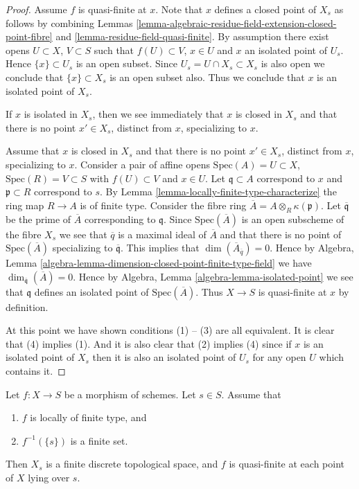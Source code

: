 \begin{proof}
Assume $f$ is quasi-finite at $x$.
Note that $x$ defines a closed point of $X_s$ as follows by combining
Lemmas \ref{lemma-algebraic-residue-field-extension-closed-point-fibre} and
\ref{lemma-residue-field-quasi-finite}.
By assumption there exist opens $U \subset X$, $V \subset S$ such
that $f(U) \subset V$, $x \in U$ and $x$ an isolated point
of $U_s$. Hence $\{x\} \subset U_s$ is an open subset.
Since $U_s = U \cap X_s \subset X_s$ is also open we conclude
that $\{x\} \subset X_s$ is an open subset also. Thus we conclude
that $x$ is an isolated point of $X_s$.

\medskip\noindent
If $x$ is isolated in $X_s$, then we see immediately that
$x$ is closed in $X_s$ and that there is no point $x' \in X_s$,
distinct from $x$, specializing to $x$.

\medskip\noindent
Assume that $x$ is closed in $X_s$ and that there is no point $x' \in X_s$,
distinct from $x$, specializing to $x$. Consider a pair of affine opens
$\text{Spec}(A) = U \subset X$, $\text{Spec}(R) = V \subset S$ with
$f(U) \subset V$ and $x \in U$. Let $\mathfrak q \subset A$ correspond to
$x$ and $\mathfrak p \subset R$ correspond to $s$.
By Lemma \ref{lemma-locally-finite-type-characterize} the ring map
$R \to A$ is of finite type. Consider the fibre ring
$\overline{A} = A \otimes_R \kappa(\mathfrak p)$.
Let $\overline{\mathfrak q}$ be the prime of $\overline{A}$ corresponding
to $\mathfrak q$. Since $\text{Spec}(\overline{A})$ is an open subscheme of
the fibre $X_s$ we see that $\overline{q}$ is a maximal ideal
of $\overline{A}$ and that there is no point of $\text{Spec}(\overline{A})$
specializing to $\overline{\mathfrak q}$.
This implies that $\dim(\overline{A}_{\overline{q}}) = 0$.
Hence by
Algebra, Lemma \ref{algebra-lemma-dimension-closed-point-finite-type-field}
we have $\dim_{\overline{\mathfrak q}}(\overline{A}) = 0$.
Hence by Algebra, Lemma \ref{algebra-lemma-isolated-point}
we see that $\mathfrak q$ defines an isolated point of
$\text{Spec}(\overline{A})$. Thus $X \to S$ is quasi-finite at
$x$ by definition.

\medskip\noindent
At this point we have shown conditions (1) -- (3) are all equivalent.
It is clear that (4) implies (1). And it is also clear that
(2) implies (4) since if $x$ is an isolated point of $X_s$
then it is also an isolated point of $U_s$ for any open $U$
which contains it.
\end{proof}

\begin{lemma}
\label{lemma-finite-fibre}
Let $f : X \to S$ be a morphism of schemes.
Let $s \in S$. Assume that
\begin{enumerate}
\item $f$ is locally of finite type, and
\item $f^{-1}(\{s\})$ is a finite set.
\end{enumerate}
Then $X_s$ is a finite discrete topological space, and
$f$ is quasi-finite at each point of $X$ lying over $s$.
\end{lemma}

